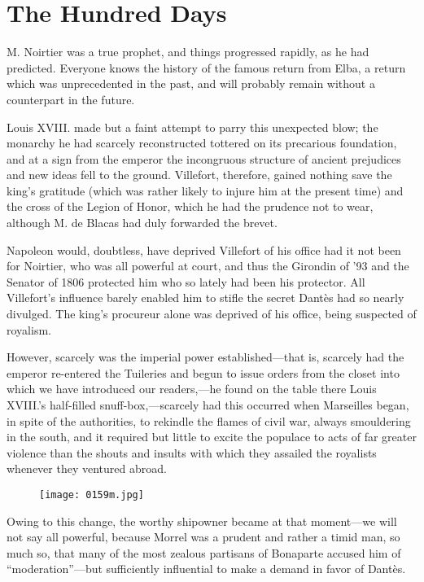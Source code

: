 \chapter{The Hundred Days}

M. Noirtier was a true prophet, and things progressed rapidly, as he
had predicted. Everyone knows the history of the famous return from
Elba, a return which was unprecedented in the past, and will probably
remain without a counterpart in the future.

Louis XVIII. made but a faint attempt to parry this unexpected blow;
the monarchy he had scarcely reconstructed tottered on its precarious
foundation, and at a sign from the emperor the incongruous structure of
ancient prejudices and new ideas fell to the ground. Villefort,
therefore, gained nothing save the king’s gratitude (which was rather
likely to injure him at the present time) and the cross of the Legion
of Honor, which he had the prudence not to wear, although M. de Blacas
had duly forwarded the brevet.

Napoleon would, doubtless, have deprived Villefort of his office had it
not been for Noirtier, who was all powerful at court, and thus the
Girondin of ’93 and the Senator of 1806 protected him who so lately had
been his protector. All Villefort’s influence barely enabled him to
stifle the secret Dantès had so nearly divulged. The king’s procureur
alone was deprived of his office, being suspected of royalism.

However, scarcely was the imperial power established—that is, scarcely
had the emperor re-entered the Tuileries and begun to issue orders from
the closet into which we have introduced our readers,—he found on the
table there Louis XVIII.’s half-filled snuff-box,—scarcely had this
occurred when Marseilles began, in spite of the authorities, to
rekindle the flames of civil war, always smouldering in the south, and
it required but little to excite the populace to acts of far greater
violence than the shouts and insults with which they assailed the
royalists whenever they ventured abroad.

\begin{figure}[h]
\texttt{[image: 0159m.jpg]}
\end{figure}

Owing to this change, the worthy shipowner became at that moment—we
will not say all powerful, because Morrel was a prudent and rather a
timid man, so much so, that many of the most zealous partisans of
Bonaparte accused him of “moderation”—but sufficiently influential to
make a demand in favor of Dantès.

